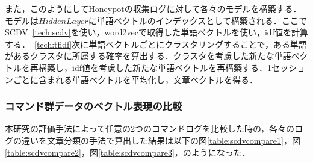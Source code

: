 また，このようにしてHoneypotの収集ログに対して各々のモデルを構築する．モデルは$ Hidden Layer $に単語ベクトルのインデックスとして構築される．ここでSCDV~\ref{tech:scdv}を使い，word2vecで取得した単語ベクトルを使い，idf値を計算する．~\ref{tech:tfidf}次に単語ベクトルごとにクラスタリングすることで，ある単語があるクラスタに所属する確率を算出する．クラスタを考慮した新たな単語ベクトルを再構築し，idf値を考慮した新たな単語ベクトルを再構築する．1セッションごとに含まれる単語ベクトルを平均化し，文章ベクトルを得る．

\subsubsection{コマンド群データのベクトル表現の比較}
\label{eval:CommandVector}
本研究の評価手法によって任意の2つのコマンドログを比較した時の，各々のログの違いを文章分類の手法で算出した結果は以下の図\ref{table:scdvcompare1}，図\ref{table:scdvcompare2}，図\ref{table:scdvcompare3}，のようになった．
\clearpage

